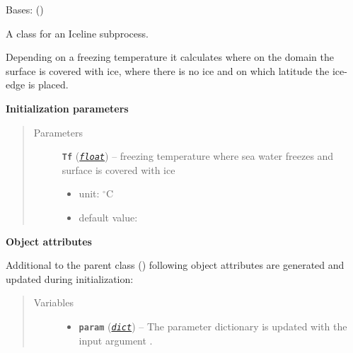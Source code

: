\documentclass[a4paper,10pt,english]{sphinxmanual}
\begin{document}

\begin{fulllineitems}
\label{api/climlab.surface:climlab.surface.albedo.Iceline}
Bases: {\hyperref[api/climlab.process:climlab.process.diagnostic.DiagnosticProcess]{\emph{}}} ()

A class for an Iceline subprocess.

Depending on a freezing temperature it calculates where on the domain the
surface is covered with ice, where there is no ice and on which latitude the ice-edge 
is placed.

\textbf{Initialization parameters}
\begin{quote}\begin{description}
\item[{Parameters}] \leavevmode
\textbf{\texttt{Tf}} (\href{http://docs.python.org/2.7/library/functions.html\#float}{\emph{\texttt{float}}}) -- 
freezing temperature where sea water freezes and
surface is covered with ice
\begin{itemize}
\item {} 
unit: \(^{\circ} \textrm{C}\)

\item {} 
default value: 

\end{itemize}


\end{description}\end{quote}

\textbf{Object attributes}

Additional to the parent class 
{\hyperref[api/climlab.process:climlab.process.diagnostic.DiagnosticProcess]{\emph{}}} ()
following object attributes are generated and updated during initialization:
\begin{quote}\begin{description}
\item[{Variables}] \leavevmode\begin{itemize}
\item {} 
\textbf{\texttt{param}} (\href{http://docs.python.org/2.7/library/stdtypes.html\#dict}{\emph{\texttt{dict}}}) -- The parameter dictionary is updated with the 
input argument .


\end{itemize}
\end{description}
\end{quote}
\end{fulllineitems}
\end{document}
